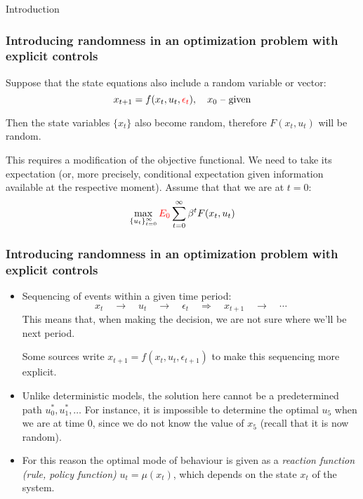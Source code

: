 \documentclass[10pt]{beamer}
\theoremstyle{definition}
\begin{document}
\begin{section}{Introduction}
\begin{frame}
\frametitle{Introducing randomness in an optimization problem with explicit controls}
Suppose that the state equations also include a random variable or vector:
\begin{equation}
x_{t+1}=f(x_t,u_t,{\color{red}\epsilon_t}),\quad x_0 \text{ -- given} \label{eq:statestoch}
\end{equation}

Then the state variables $ \{x_t\} $ also become random, therefore $ F(x_t,u_t) $ will be random.

This requires a modification of the objective functional. We need to take its expectation (or, more precisely, conditional expectation given information available at the respective moment). Assume that that we are at $ t=0 $:
\begin{equation}
\max_{\{u_t\}_{t=0}^\infty}{\color{red}E_0}\sum_{t=0}^\infty
\beta^t F(x_t,u_t)\label{eq:objstoch}
\end{equation}
\end{frame}



\begin{frame}
\frametitle{Introducing randomness in an optimization problem with explicit controls }
\begin{itemize}
\item Sequencing of events within a given time period:\[ x_t \quad \rightarrow \quad u_t \quad \rightarrow \quad \epsilon_t \quad \Longrightarrow \quad x_{t+1}\quad \rightarrow \quad \cdots \] This means that, when making the decision, we are not sure where we'll be next period.

Some sources write $ x_{t+1}=f(x_t,u_t,\epsilon_{t+1}) $ to make this sequencing more explicit.
\item Unlike deterministic models, the solution here cannot be a predetermined path $ u^*_0, u^*_1, \ldots $ For instance, it is impossible to determine the optimal $ u_5 $ when we are at time 0, since we do not know the value of $ x_5 $ (recall that it is now random).
\item For this reason the optimal mode of behaviour is given as a \emph{reaction function (rule, policy function)} $ u_t=\mu(x_t) $, which depends on the state $ x_t $ of the system. 
\end{itemize}
\end{frame}



\end{section}
\end{document}
